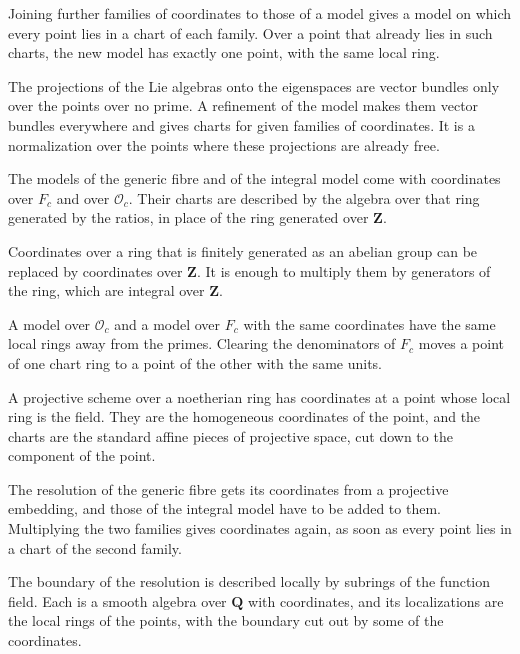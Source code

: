 Joining further families of coordinates to those of a model gives a model on which every point lies in a chart of each family.
Over a point that already lies in such charts, the new model has exactly one point, with the same local ring.

The projections of the Lie algebras onto the eigenspaces are vector bundles only over the points over no prime. A refinement
of the model makes them vector bundles everywhere and gives charts for given families of coordinates. It is a normalization
over the points where these projections are already free.

The models of the generic fibre and of the integral model come with coordinates over $F_c$ and over $\mathcal O_c$. Their charts
are described by the algebra over that ring generated by the ratios, in place of the ring generated over $\mathbf Z$.

Coordinates over a ring that is finitely generated as an abelian group can be replaced by coordinates over $\mathbf Z$. It is
enough to multiply them by generators of the ring, which are integral over $\mathbf Z$.

A model over $\mathcal O_c$ and a model over $F_c$ with the same coordinates have the same local rings away from the primes.
Clearing the denominators of $F_c$ moves a point of one chart ring to a point of the other with the same units.

A projective scheme over a noetherian ring has coordinates at a point whose local ring is the field. They are the homogeneous
coordinates of the point, and the charts are the standard affine pieces of projective space, cut down to the component of the
point.

The resolution of the generic fibre gets its coordinates from a projective embedding, and those of the integral model have to be
added to them. Multiplying the two families gives coordinates again, as soon as every point lies in a chart of the second family.

The boundary of the resolution is described locally by subrings of the function field. Each is a smooth algebra over $\mathbf Q$
with coordinates, and its localizations are the local rings of the points, with the boundary cut out by some of the coordinates.

